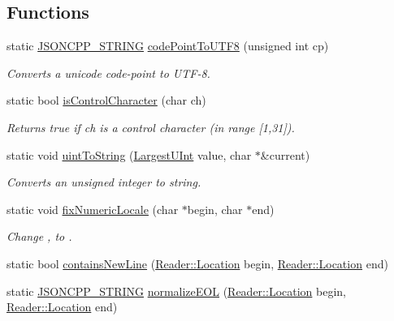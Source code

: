\subsection*{Functions}
\begin{DoxyCompactItemize}
\item 
static \hyperlink{json_8hpp_a1e723f95759de062585bc4a8fd3fa4be}{J\+S\+O\+N\+C\+P\+P\+\_\+\+S\+T\+R\+I\+NG} \hyperlink{namespaceJson_a33f8bda65a5b1fc4f5ddc39cb03dc742}{code\+Point\+To\+U\+T\+F8} (unsigned int cp)
\begin{DoxyCompactList}\small\item\em Converts a unicode code-\/point to U\+T\+F-\/8. \end{DoxyCompactList}\item 
static bool \hyperlink{namespaceJson_a0381e631737f51331065a388f4f59197}{is\+Control\+Character} (char ch)
\begin{DoxyCompactList}\small\item\em Returns true if ch is a control character (in range \mbox{[}1,31\mbox{]}). \end{DoxyCompactList}\item 
static void \hyperlink{namespaceJson_ac1ffd21a9e55122014353c773ccc496e}{uint\+To\+String} (\hyperlink{namespaceJson_ae202ecad69725e23443f465e257456d0}{Largest\+U\+Int} value, char $\ast$\&current)
\begin{DoxyCompactList}\small\item\em Converts an unsigned integer to string. \end{DoxyCompactList}\item 
static void \hyperlink{namespaceJson_aa208904144dc7b11ccc28f47c9afab9a}{fix\+Numeric\+Locale} (char $\ast$begin, char $\ast$end)
\begin{DoxyCompactList}\small\item\em Change \textquotesingle{},\textquotesingle{} to \textquotesingle{}. \end{DoxyCompactList}\item 
static bool \hyperlink{namespaceJson_a4d6ab0f651348832e5cc49b577a854d2}{contains\+New\+Line} (\hyperlink{classJson_1_1Reader_a46795b5b272bf79a7730e406cb96375a}{Reader\+::\+Location} begin, \hyperlink{classJson_1_1Reader_a46795b5b272bf79a7730e406cb96375a}{Reader\+::\+Location} end)
\item 
static \hyperlink{json_8hpp_a1e723f95759de062585bc4a8fd3fa4be}{J\+S\+O\+N\+C\+P\+P\+\_\+\+S\+T\+R\+I\+NG} \hyperlink{namespaceJson_a63123f3dd63f340ac517a59f44ea7aa4}{normalize\+E\+OL} (\hyperlink{classJson_1_1Reader_a46795b5b272bf79a7730e406cb96375a}{Reader\+::\+Location} begin, \hyperlink{classJson_1_1Reader_a46795b5b272bf79a7730e406cb96375a}{Reader\+::\+Location} end)

\end{DoxyCompactItemize}
